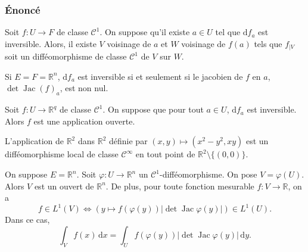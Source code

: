  \subsubsection{Énoncé}


  \begin{theorem}
    Soit $f : U \rightarrow F$ de classe $\mathcal{C}^1$. On suppose qu'il existe $a \in U$ tel que $\mathrm{d}f_a$ est inversible.
    \newpar
    Alors, il existe $V$ voisinage de $a$ et $W$ voisinage de $f(a)$ tels que $f_{|V}$ soit un difféomorphisme de classe $\mathcal{C}^1$ de $V$ sur $W$.
  \end{theorem}

  \begin{remark}
    Si $E = F = \mathbb{R}^n$, $\mathrm{d}f_a$ est inversible si et seulement si le jacobien de $f$ en $a$, $\det \operatorname{Jac}(f)_a$, est non nul.
  \end{remark}

  \begin{corollary}
    Soit $f : U \rightarrow \mathbb{R}^q$ de classe $\mathcal{C}^1$. On suppose que pour tout $a \in U$, $\mathrm{d}f_a$ est inversible. Alors $f$ est une application ouverte.
  \end{corollary}


  \begin{example}
    \label{214-1}
    L'application de $\mathbb{R}^2$ dans $\mathbb{R}^2$ définie par $(x, y) \mapsto (x^2-y^2, xy)$ est un difféomorphisme local de classe $\mathcal{C}^\infty$ en tout point de $\mathbb{R}^2 \setminus \{(0,0)\}$.
  \end{example}


  \begin{application}
    On suppose $E = \mathbb{R}^n$. Soit $\varphi : U \to \mathbb{R}^n$ un $\mathcal{C}^1$-difféomorphisme. On pose $V = \varphi(U)$. Alors $V$ est un ouvert de $\mathbb{R}^n$. De plus, pour toute fonction mesurable $f : V \to \mathbb{R}$, on a
    \[
      f \in L^1(V)
      \iff
      \left(y \mapsto
      f(\varphi(y)) \left| \det \operatorname{Jac}\varphi(y) \right|\right)
      \in L^1(U).
    \]
    Dans ce cas,
    \[
      \int_V f(x) \, \mathrm{d}x
      =
      \int_U f(\varphi(y))
      \left| \det \operatorname{Jac}\varphi(y) \right| \, \mathrm{d}y.
    \]
  \end{application}

